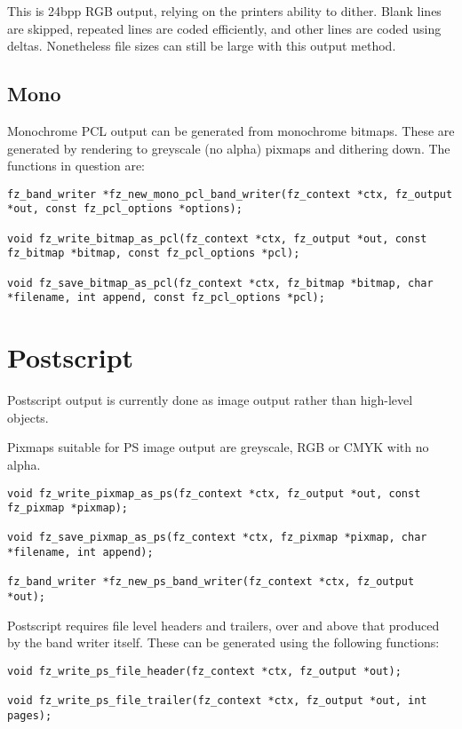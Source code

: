 \documentclass[oneside]{book}
\begin{document}
This is 24bpp RGB output, relying on the printers ability to dither. Blank lines are skipped, repeated lines are coded efficiently, and other lines are coded using deltas. Nonetheless file sizes can still be large with this output method.

\subsection{Mono}

Monochrome PCL output can be generated from monochrome bitmaps. These are generated by rendering to greyscale (no alpha) pixmaps and dithering down. The functions in question are:

\begin{lstlisting}
fz_band_writer *fz_new_mono_pcl_band_writer(fz_context *ctx, fz_output *out, const fz_pcl_options *options);

void fz_write_bitmap_as_pcl(fz_context *ctx, fz_output *out, const fz_bitmap *bitmap, const fz_pcl_options *pcl);

void fz_save_bitmap_as_pcl(fz_context *ctx, fz_bitmap *bitmap, char *filename, int append, const fz_pcl_options *pcl);
\end{lstlisting}

\section{Postscript}

Postscript output is currently done as image output rather than high-level objects.

Pixmaps suitable for PS image output are greyscale, RGB or CMYK with no alpha.

\begin{lstlisting}
void fz_write_pixmap_as_ps(fz_context *ctx, fz_output *out, const fz_pixmap *pixmap);

void fz_save_pixmap_as_ps(fz_context *ctx, fz_pixmap *pixmap, char *filename, int append);

fz_band_writer *fz_new_ps_band_writer(fz_context *ctx, fz_output *out);
\end{lstlisting}

Postscript requires file level headers and trailers, over and above that produced by the band writer itself. These can be generated using the following functions:

\begin{lstlisting}
void fz_write_ps_file_header(fz_context *ctx, fz_output *out);

void fz_write_ps_file_trailer(fz_context *ctx, fz_output *out, int pages);
\end{lstlisting}
\end{document}

